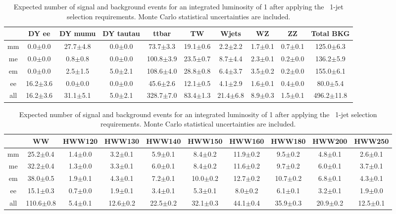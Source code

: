 \begin{table}[!ht]
  \begin{center}
 {\small
  \begin{tabular} {|c|c|c|c|c|c|c|c|c|c|}
\hline
  & DY ee & DY mumu & DY tautau & ttbar & TW & Wjets & WZ & ZZ & Total BKG \\
  \hline
  \hline
  mm &  0.0$\pm$0.0 & 27.7$\pm$4.8 &  0.0$\pm$0.0 & 73.7$\pm$3.3 & 19.1$\pm$0.6 &  2.2$\pm$2.2 &  1.7$\pm$0.1 &  0.7$\pm$0.1 & 125.0$\pm$6.3 \\
  me &  0.0$\pm$0.0 &  0.8$\pm$0.8 &  0.0$\pm$0.0 & 100.8$\pm$3.9 & 23.5$\pm$0.7 &  8.7$\pm$4.4 &  2.3$\pm$0.1 &  0.2$\pm$0.0 & 136.2$\pm$5.9 \\
  em &  0.0$\pm$0.0 &  2.5$\pm$1.5 &  5.0$\pm$2.1 & 108.6$\pm$4.0 & 28.8$\pm$0.8 &  6.4$\pm$3.7 &  3.5$\pm$0.2 &  0.2$\pm$0.0 & 155.0$\pm$6.1 \\
  ee & 16.2$\pm$3.6 &  0.0$\pm$0.0 &  0.0$\pm$0.0 & 45.6$\pm$2.6 & 12.1$\pm$0.5 &  4.1$\pm$2.9 &  1.6$\pm$0.1 &  0.4$\pm$0.0 & 80.0$\pm$5.4 \\
 \hline
 all & 16.2$\pm$3.6 & 31.1$\pm$5.1 &  5.0$\pm$2.1 & 328.7$\pm$7.0 & 83.4$\pm$1.3 & 21.4$\pm$6.8 &  8.9$\pm$0.3 &  1.5$\pm$0.1 & 496.2$\pm$11.8 \\
 \hline
  \end{tabular}
  }
 {\small
  \begin{tabular} {|c|c|c|c|c|c|c|c|c|c|}
  \hline
  & WW  &  HWW120 &  HWW130 &  HWW140 & HWW150 &  HWW160 &  HWW180 &  HWW200 &  HWW250 \\
  \hline
  \hline
  mm & 25.2$\pm$0.4 &  1.4$\pm$0.0 &  3.2$\pm$0.1 &  5.9$\pm$0.1 &  8.4$\pm$0.2 & 11.9$\pm$0.2 &  9.5$\pm$0.2 &  4.8$\pm$0.1 &  2.6$\pm$0.1 \\
  me & 32.2$\pm$0.4 &  1.3$\pm$0.0 &  3.3$\pm$0.1 &  6.0$\pm$0.1 &  8.4$\pm$0.2 & 11.6$\pm$0.2 &  9.7$\pm$0.2 &  6.0$\pm$0.1 &  3.7$\pm$0.1 \\
  em & 38.0$\pm$0.5 &  1.9$\pm$0.1 &  4.3$\pm$0.1 &  7.2$\pm$0.1 & 10.0$\pm$0.2 & 12.7$\pm$0.2 & 10.7$\pm$0.2 &  6.8$\pm$0.1 &  4.3$\pm$0.1 \\
  ee & 15.1$\pm$0.3 &  0.7$\pm$0.0 &  1.9$\pm$0.1 &  3.4$\pm$0.1 &  5.3$\pm$0.1 &  8.0$\pm$0.2 &  6.1$\pm$0.1 &  3.2$\pm$0.1 &  1.9$\pm$0.0 \\
  \hline
 all & 110.6$\pm$0.8 &  5.4$\pm$0.1 & 12.6$\pm$0.2 & 22.5$\pm$0.2 & 32.1$\pm$0.3 & 44.1$\pm$0.4 & 35.9$\pm$0.3 & 20.9$\pm$0.2 & 12.5$\pm$0.1 \\
 \hline
  \end{tabular}
  }
  \caption{Expected number of signal and background events for an 
  integrated luminosity of 1\ifb{} after 
  applying the \ww\ 1-jet selection requirements. Monte Carlo statistical uncertainties are 
  included.}
   \label{tab:wwselection1}
  \end{center}
\end{table}

